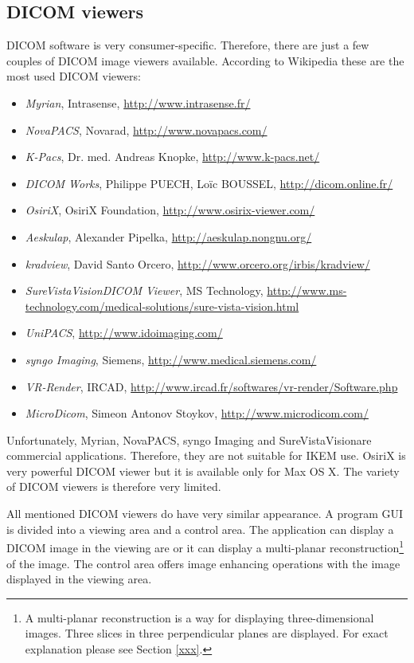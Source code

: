 \subsection{DICOM viewers}
\label{viewers}
DICOM software is very consumer-specific. Therefore, there are just a few couples of DICOM image viewers available. According to Wikipedia these are the most used DICOM viewers:

\begin{itemize}
  \setlength{\itemsep}{0pt}
  \setlength{\parskip}{0pt}
  \setlength{\parsep}{0pt}
\item \emph{Myrian}, Intrasense, \url{http://www.intrasense.fr/}
\item \emph{NovaPACS}, Novarad, \url{http://www.novapacs.com/}
\item \emph{K-Pacs}, Dr. med. Andreas Knopke, \url{http://www.k-pacs.net/}
\item \emph{DICOM Works}, Philippe PUECH, Loïc BOUSSEL, \url{http://dicom.online.fr/}
\item \emph{OsiriX}, OsiriX Foundation, \url{http://www.osirix-viewer.com/}
\item \emph{Aeskulap}, Alexander Pipelka, \url{http://aeskulap.nongnu.org/}
\item \emph{kradview}, David Santo Orcero, \url{http://www.orcero.org/irbis/kradview/}
\item \emph{SureVistaVision\texttrademark DICOM Viewer}, MS Technology, \url{http://www.ms-technology.com/medical-solutions/sure-vista-vision.html}
\item \emph{UniPACS},  \url{http://www.idoimaging.com/}
\item \emph{syngo Imaging}, Siemens, \url{http://www.medical.siemens.com/}
\item \emph{VR-Render}, IRCAD, \url{http://www.ircad.fr/softwares/vr-render/Software.php}
\item \emph{MicroDicom}, Simeon Antonov Stoykov, \url{http://www.microdicom.com/}
\end{itemize}

Unfortunately, Myrian, NovaPACS, syngo Imaging and SureVistaVision\texttrademark are commercial applications. Therefore, they are not suitable for IKEM use. OsiriX is very powerful DICOM viewer but it is available only for Max OS X. The variety of DICOM viewers is therefore very limited.

All mentioned DICOM viewers do have very similar appearance. A program GUI is divided into a viewing area and a control area. The application can display a DICOM image in the viewing are or it can display a multi-planar reconstruction\footnote{A multi-planar reconstruction is a way for displaying three-dimensional images. Three slices in three perpendicular planes are displayed. For exact explanation please see Section \ref{xxx}.} of the image. The control area offers image enhancing operations with the image displayed in the viewing area.

